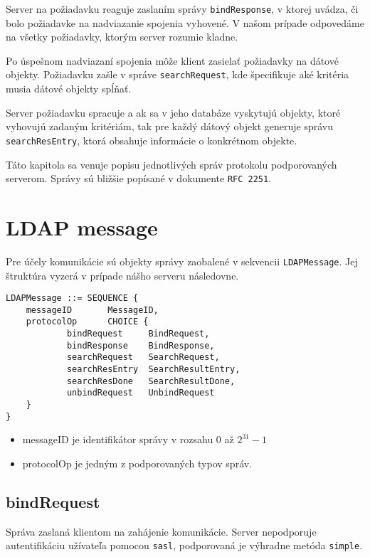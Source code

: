 \documentclass[12pt]{report}
\begin{document}
Server na požiadavku reaguje zaslaním správy \texttt{bindResponse}, v ktorej uvádza, či bolo
požiadavke na nadviazanie spojenia vyhovené.
V našom prípade odpovedáme na všetky požiadavky, ktorým server rozumie kladne.

Po úspešnom nadviazaní spojenia môže klient zasielať požiadavky na dátové objekty.
Požiadavku zašle v správe \texttt{searchRequest},
kde špecifikuje aké kritéria musia dátové objekty spĺňať.

Server požiadavku spracuje a ak sa v jeho databáze vyskytujú objekty,
ktoré vyhovujú zadaným kritériám, tak pre každý dátový objekt generuje
správu \texttt{searchResEntry}, ktorá obsahuje informácie o konkrétnom objekte.

Táto kapitola sa venuje popisu jednotlivých správ protokolu podporovaných serverom. Správy sú
bližšie popísané v dokumente \texttt{RFC 2251}\cite{RFC2251}.

\section{LDAP message}

Pre účely komunikácie sú objekty správy zaobalené v sekvencii \texttt{LDAPMessage}. Jej štruktúra
vyzerá v prípade nášho serveru následovne.

\begin{verbatim}
LDAPMessage ::= SEQUENCE {
    messageID       MessageID,
    protocolOp      CHOICE {
            bindRequest     BindRequest,
            bindResponse    BindResponse,
            searchRequest   SearchRequest,
            searchResEntry  SearchResultEntry,
            searchResDone   SearchResultDone,
            unbindRequest   UnbindRequest
    }
}
\end{verbatim}

\begin{itemize}
    \item messageID je identifikátor správy v rozsahu $0$ až $2^{31} -1$
    \item protocolOp je jedným z podporovaných typov správ.
\end{itemize}

\subsection{bindRequest}

Správa zaslaná klientom na zahájenie komunikácie.
Server nepodporuje autentifikáciu užívateľa pomocou \texttt{sasl},
podporovaná je výhradne metóda \texttt{simple}.
\end{document}
